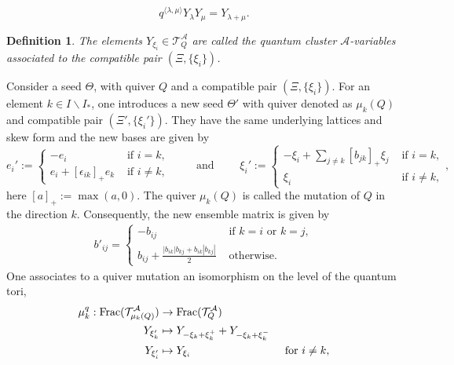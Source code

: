 \documentclass[a4paper]{article}
\numberwithin{equation}{section}
\newtheorem{definition}[counter]{Definition}
\newcommand{\1}{{\mathrm{1}\mkern-4mu{\mathchoice{}{}{\mskip-0.5mu}{\mskip-1mu}}\mathrm{l}}}
\DeclareMathOperator{\Frac}{Frac}
\begin{document}
\begin{equation}
    q^{\langle\lambda,\mu\rangle}Y_\lambda Y_{\mu}= Y_{\lambda+\mu}.
\end{equation}
\begin{definition}
    The elements $Y_{\xi_i} \in \mathcal{T}_Q^{\mathcal{A}}$ are called the quantum cluster $\mathcal{A}$-variables associated to the compatible pair $(\Xi,\{\xi_i\})$.
\end{definition}
Consider a seed $\Theta$, with quiver $Q$ and a compatible pair $(\Xi, \{\xi_i\})$. For an element $k \in I\backslash I_{\ast}$, one introduces a new seed $\Theta'$ with quiver denoted as $\mu_k(Q)$ and compatible pair $(\Xi', \{\xi_i'\})$. They have the same underlying lattices and skew form and the new bases are given by
\begin{equation}
  e_i' :=  \begin{cases}
      -e_i  & \text{ if }i = k,\\
      e_i + [\epsilon_{ik}]_{+}e_k  & \text{ if }i \neq k,
    \end{cases} \qquad \text{ and } \qquad  \xi_i' := \begin{cases}
      -\xi_i + \sum_{j\neq k } [b_{jk}]_+\xi_j  & \text{ if }i = k,\\
      \xi_i   & \text{ if }i \neq k,
    \end{cases},
\end{equation}
here $[a]_+ := \max(a,0)$. The quiver $\mu_k(Q)$ is called the mutation of $Q$ in the direction $k$. Consequently, the new ensemble matrix is given by 
\begin{align}\label{eq: mutated b}
    b'_{ij} = \begin{cases}
       -b_{ij} & \text{ if } k=i \text{ or } k=j,\\
       b_{ij} + \frac{|b_{ik}|b_{kj}+ b_{ik}|b_{kj}|}{2} & \text{ otherwise.}
    \end{cases}
\end{align}
One associates to a quiver mutation an isomorphism on the level of the quantum tori,
\begin{equation}
\begin{aligned}
    \mu_k^q: \Frac(\mathcal{T}_{\mu_k(Q)}^\mathcal{A})  &\to \Frac(\mathcal{T}_{Q}^\mathcal{A})\\
    Y_{\xi_k'} &\mapsto Y_{-\xi_k + \xi_k^+} +  Y_{-\xi_k + \xi_k^-}\\
    Y_{\xi_i'} &\mapsto Y_{\xi_i} \hspace{29mm} \text{ for } i \neq k,
\end{aligned}
\end{equation}
\end{document}
